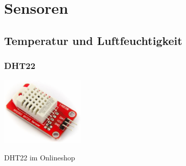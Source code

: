\documentclass[
  12pt, %
  a4paper, %
  twoside, %
  openany, %
  numbers=noenddot, %
  BCOR=5mm, %
  parskip=half*, %
  thesis, %
]{bfhbook}
\newcommand{\compImgSize}{4cm}
\begin{document}
 \section{Sensoren}
 \subsection{Temperatur und Luftfeuchtigkeit}
 \subsubsection{DHT22}\label{DHT22}
\begin{flushleft}
	\begin{minipage}[t]{0.5\linewidth}
		\centering
    		\includegraphics[width=\compImgSize, left]{Bilder/DHT22.jpg}
	\end{minipage}%
	\begin{minipage}[t]{0.5\linewidth}
	DHT22 im Onlineshop \footnotemark
	\end{minipage}
\end{flushleft}
\end{document}

